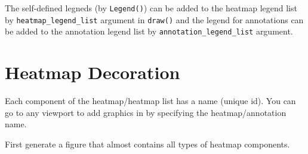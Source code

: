 \documentclass[]{book}
\theoremstyle{definition}
\theoremstyle{definition}
\theoremstyle{definition}
\theoremstyle{remark}
\begin{document}
The self-defined legneds (by \texttt{Legend()}) can be added to the
heatmap legend list by \texttt{heatmap\_legend\_list} argument in
\texttt{draw()} and the legend for annotations can be added to the
annotation legend list by \texttt{annotation\_legend\_list} argument.

\chapter{Heatmap Decoration}\label{heatmap-decoration}

Each component of the heatmap/heatmap list has a name (unique id). You
can go to any viewport to add graphics in by specifying the
heatmap/annotation name.

First generate a figure that almost contains all types of heatmap
components.
\end{document}

